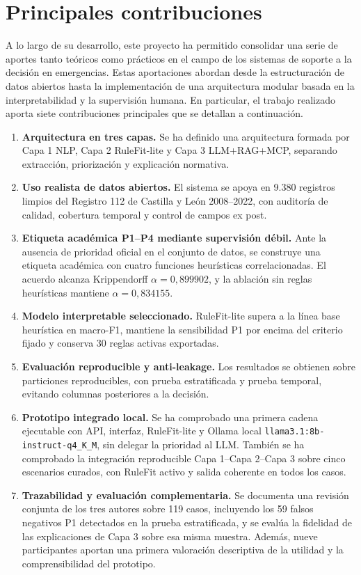 \section{Principales contribuciones}

A lo largo de su desarrollo, este proyecto ha permitido consolidar una serie de aportes tanto teóricos como prácticos en el campo de los sistemas de soporte a la decisión en emergencias. Estas aportaciones abordan desde la estructuración de datos abiertos hasta la implementación de una arquitectura modular basada en la interpretabilidad y la supervisión humana. En particular, el trabajo realizado aporta siete contribuciones principales que se detallan a continuación.

\begin{enumerate}
    \item \textbf{Arquitectura en tres capas.} Se ha definido una arquitectura formada
    por Capa 1 NLP, Capa 2 RuleFit-lite y Capa 3 LLM+RAG+MCP, separando extracción,
    priorización y explicación normativa.
    \item \textbf{Uso realista de datos abiertos.} El sistema se apoya en 9.380
    registros limpios del Registro 112 de Castilla y León 2008--2022, con auditoría de
    calidad, cobertura temporal y control de campos ex post.
    \item \textbf{Etiqueta académica P1--P4 mediante supervisión débil.} Ante la
    ausencia de prioridad oficial en el conjunto de datos, se construye una etiqueta académica
    con cuatro funciones heurísticas correlacionadas. El acuerdo alcanza Krippendorff
    \(\alpha = 0{,}899902\), y la ablación sin reglas heurísticas mantiene
    \(\alpha = 0{,}834155\).
    \item \textbf{Modelo interpretable seleccionado.} RuleFit-lite supera a la línea base
    heurística en macro-F1, mantiene la sensibilidad P1 por encima del criterio fijado y
    conserva 30 reglas activas exportadas.
    \item \textbf{Evaluación reproducible y anti-leakage.} Los resultados se obtienen
    sobre particiones reproducibles, con prueba estratificada y prueba temporal, evitando columnas
    posteriores a la decisión.
    \item \textbf{Prototipo integrado local.} Se ha comprobado una primera cadena
    ejecutable con API, interfaz, RuleFit-lite y Ollama local
    \texttt{llama3.1:8b-instruct-q4\_K\_M}, sin delegar la prioridad al LLM. También se
    ha comprobado la integración reproducible Capa 1--Capa 2--Capa 3 sobre cinco
    escenarios curados, con RuleFit activo y salida coherente en todos los casos.
    \item \textbf{Trazabilidad y evaluación complementaria.} Se
    documenta una revisión conjunta de los tres autores sobre 119 casos, incluyendo
    los 59 falsos negativos P1 detectados en la prueba estratificada, y se evalúa la
    fidelidad de las explicaciones de Capa 3 sobre esa misma muestra. Además, nueve
    participantes aportan una primera valoración descriptiva de la utilidad y la
    comprensibilidad del prototipo.
\end{enumerate}


